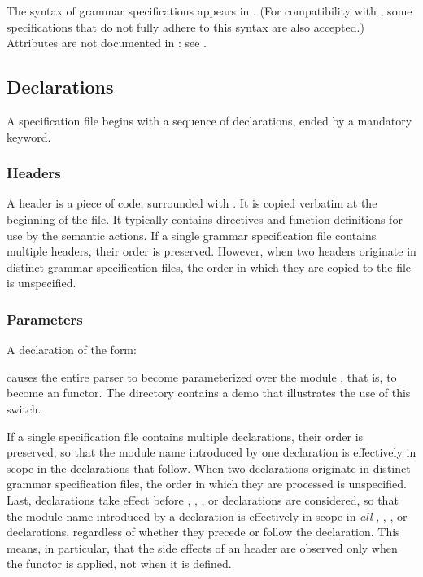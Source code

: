 \documentclass[onecolumn,11pt,nocopyrightspace,preprint]{sigplanconf}
\begin{document}
The syntax of grammar specifications appears in . (For
compatibility with \ocamlyacc, some specifications that do not fully adhere to
this syntax are also accepted.) Attributes are not documented in
: see .


\subsection{Declarations}
\label{sec:decls}

A specification file begins with a sequence of declarations, ended by a
mandatory \percentpercent keyword.

\subsubsection{Headers}

A header is a piece of \ocaml code, surrounded with . It is
copied verbatim at the beginning of the \ml file. It typically contains \ocaml
{} directives and function definitions for use by the semantic
actions. If a single grammar specification file contains multiple headers,
their order is preserved. However, when two headers originate in distinct
grammar specification files, the order in which they are copied to the \ml
file is unspecified.

\subsubsection{Parameters}
\label{sec:parameter}

A declaration of the form:
\begin{quote}
\dparameter \ocamlparam
\end{quote}
causes the entire parser to become parameterized over the \ocaml module
, that is, to become an \ocaml functor. The directory
 contains a demo that illustrates the use of this switch.

If a single specification file
contains multiple \dparameter declarations, their order is preserved, so that
the module name  introduced by one declaration is effectively in scope
in the declarations that follow. When two \dparameter declarations originate
in distinct grammar specification files, the order in which they are processed
is unspecified. Last, \dparameter declarations take effect before \dheader{$\ldots$},
\dtoken, \dtype, or \dstart declarations are considered, so that the module name
 introduced by a \dparameter declaration is effectively in scope in
\emph{all} \dheader{$\ldots$}, \dtoken, \dtype, or \dstart declarations,
regardless of whether they precede or follow the \dparameter declaration.
This means, in particular, that the side effects of an \ocaml header are
observed only when the functor is applied, not when it is defined.
\end{document}
